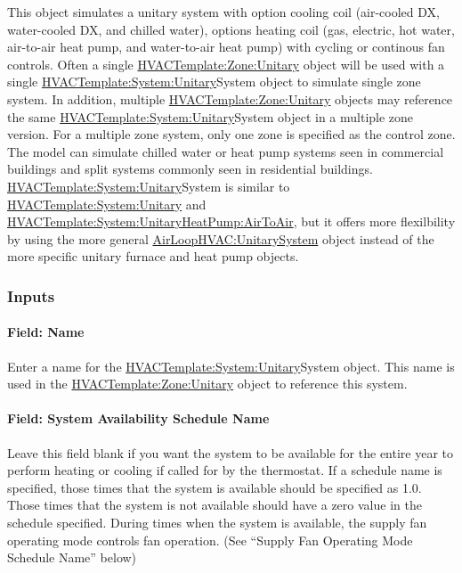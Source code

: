 This object simulates a unitary system with option cooling coil (air-cooled DX, water-cooled DX, and chilled water), options heating coil (gas, electric, hot water, air-to-air heat pump, and water-to-air heat pump) with cycling or continous fan controls. Often a single \hyperref[hvactemplatezoneunitary]{HVACTemplate:Zone:Unitary} object will be used with a single \hyperref[hvactemplatesystemunitary]{HVACTemplate:System:Unitary}System object to simulate single zone system. In addition, multiple \hyperref[hvactemplatezoneunitary]{HVACTemplate:Zone:Unitary} objects may reference the same \hyperref[hvactemplatesystemunitary]{HVACTemplate:System:Unitary}System object in a multiple zone version. For a multiple zone system, only one zone is specified as the control zone. The model can simulate chilled water or heat pump systems seen in commercial buildings and split systems commonly seen in residential buildings. \hyperref[hvactemplatesystemunitary]{HVACTemplate:System:Unitary}System is similar to \hyperref[hvactemplatesystemunitary]{HVACTemplate:System:Unitary} and \hyperref[hvactemplatesystemunitaryheatpumpairtoair]{HVACTemplate:System:UnitaryHeatPump:AirToAir}, but it offers more flexilbility by using the more general \hyperref[airloophvacunitarysystem]{AirLoopHVAC:UnitarySystem} object instead of the more specific unitary furnace and heat pump objects.

\subsubsection{Inputs}\label{inputs-2016-06-16-1621}

\paragraph{Field: Name}\label{field-name-4-013}

Enter a name for the \hyperref[hvactemplatesystemunitary]{HVACTemplate:System:Unitary}System object. This name is used in the \hyperref[hvactemplatezoneunitary]{HVACTemplate:Zone:Unitary} object to reference this system.

\paragraph{Field: System Availability Schedule Name}\label{field-system-availability-schedule-name-9}

Leave this field blank if you want the system to be available for the entire year to perform heating or cooling if called for by the thermostat. If a schedule name is specified, those times that the system is available should be specified as 1.0. Those times that the system is not available should have a zero value in the schedule specified. During times when the system is available, the supply fan operating mode controls fan operation. (See ``Supply Fan Operating Mode Schedule Name'' below)

